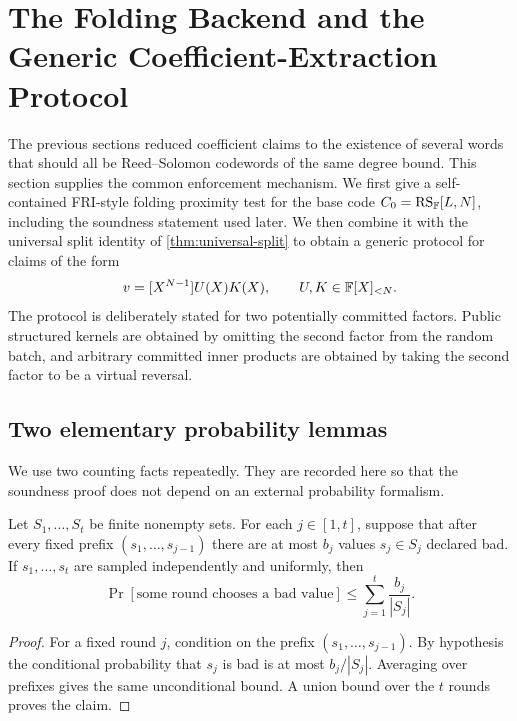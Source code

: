 \section{The Folding Backend and the Generic Coefficient-Extraction Protocol}
\label{sec:generic-protocol}

The previous sections reduced coefficient claims to the existence of several words that should all be Reed--Solomon codewords of the same degree bound.  This section supplies the common enforcement mechanism.  We first give a self-contained FRI-style folding proximity test for the base code $C_0=\operatorname{RS}_{\mathbb{F}}[L,N]$, including the soundness statement used later.  We then combine it with the universal split identity of \cref{thm:universal-split} to obtain a generic protocol for claims of the form
\[
  v=[X^{N-1}]U(X)K(X),
  \qquad U,K\in\mathbb{F}[X]_{<N}.
\]
The protocol is deliberately stated for two potentially committed factors.  Public structured kernels are obtained by omitting the second factor from the random batch, and arbitrary committed inner products are obtained by taking the second factor to be a virtual reversal.

\subsection{Two elementary probability lemmas}
\label{sec:generic-probability}

We use two counting facts repeatedly.  They are recorded here so that the soundness proof does not depend on an external probability formalism.

\begin{lemma}
\label{lem:sequential-bad-challenges}
Let $S_1,\ldots,S_t$ be finite nonempty sets.  For each $j\in[1,t]$, suppose that after every fixed prefix $(s_1,\ldots,s_{j-1})$ there are at most $b_j$ values $s_j\in S_j$ declared bad.  If $s_1,\ldots,s_t$ are sampled independently and uniformly, then
\[
  \Pr[\text{some round chooses a bad value}]
  \le
  \sum_{j=1}^{t}\frac{b_j}{|S_j|}.
\]
\end{lemma}

\begin{proof}
For a fixed round $j$, condition on the prefix $(s_1,\ldots,s_{j-1})$.  By hypothesis the conditional probability that $s_j$ is bad is at most $b_j/|S_j|$.  Averaging over prefixes gives the same unconditional bound.  A union bound over the $t$ rounds proves the claim.
\end{proof}

